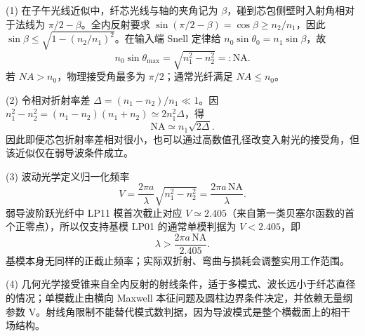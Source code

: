 (1) 在子午光线近似中，纤芯光线与轴的夹角记为 \(\beta \)，碰到芯包侧壁时入射角相对于法线为 \(\pi/2-\beta\)。全内反射要求 \(\sin(\pi/2-\beta)=\cos\beta\ge n_2/n_1\)，因此 \(\sin\beta\le\sqrt{1-(n_2/n_1)^2}\)。在输入端 Snell 定律给 \(n_0\sin\theta_0=n_1\sin\beta\)，故
\[
n_0\sin\theta_{\max}=\sqrt{n_1^2-n_2^2}=:\mathrm{NA}.
\]
若 \(NA>n_{0}\)，物理接受角最多为 \(\pi /2\)；通常光纤满足 \(NA\le n_{0}\)。

(2) 令相对折射率差 \(\Delta=(n_1-n_2)/n_1\ll1\)。因 \(n_1^2-n_2^2=(n_1-n_2)(n_1+n_2)\simeq2n_1^2\Delta\)，得
\[
\mathrm{NA}\simeq n_1\sqrt{2\Delta}.
\]
因此即便芯包折射率差相对很小，也可以通过高数值孔径改变入射光的接受角，但该近似仅在弱导波条件成立。

(3) 波动光学定义归一化频率
\[
V=\frac{2\pi a}{\lambda}\sqrt{n_1^2-n_2^2}
=\frac{2\pi a\,\mathrm{NA}}{\lambda}.
\]
弱导波阶跃光纤中 LP11 模首次截止对应 \(V\simeq2.405\)（来自第一类贝塞尔函数的首个正零点），所以仅支持基模 LP01 的通常单模判据为 \(V<2.405\)，即
\[
\lambda>\frac{2\pi a\,\mathrm{NA}}{2.405}.
\]
基模本身无同样的正截止频率；实际双折射、弯曲与损耗会调整实用工作范围。

(4) 几何光学接受锥来自全内反射的射线条件，适于多模式、波长远小于纤芯直径的情况；单模截止由横向 Maxwell 本征问题及圆柱边界条件决定，并依赖无量纲参数 V。射线角限制不能替代模式数判据，因为导波模式是整个横截面上的相干场结构。
